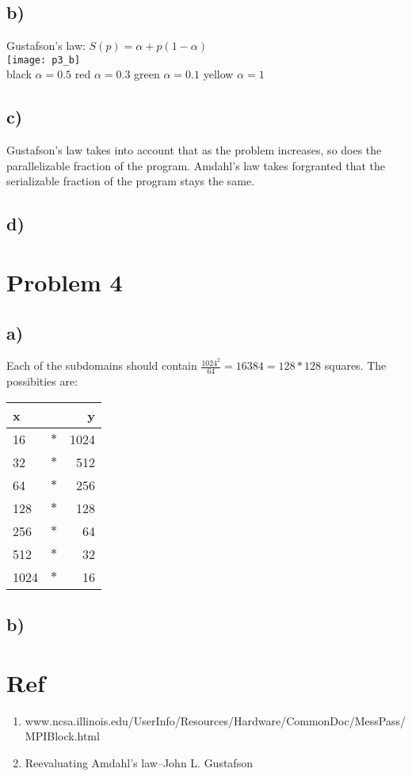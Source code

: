 \documentclass[a4paper, 11pt, english]{article}
\begin{document}
\subsection*{b)}
Gustafson's law: 
\begin{math}
S(p) = \alpha + p(1 - \alpha)
\end{math}\\
\texttt{[image: p3\_b]}
\\black $\alpha = 0.5$ red $\alpha=0.3$ green $\alpha=0.1$ yellow $\alpha=1$
\subsection*{c)}
Gustafson's law takes into account that as the problem increases, so does the parallelizable fraction of the program. Amdahl's law takes forgranted that the serializable fraction of the program stays the same.
\subsection*{d)}


\section*{Problem 4}
\subsection*{a)}
Each of the subdomains should contain  
\begin{math}
\frac{1024^2}{64} = 16384 = 128 * 128
\end{math}
squares. The possibities are:\\
\begin{tabular}{l c r }
	x && y	\\
	\hline
	16 	&$*$& 	1024 	\\
	32 	&$*$& 	512 	\\ 
	64 	&$*$& 	256 	\\
	128 	&$*$& 	128 	\\
	256 	&$*$& 	64 	\\
	512 	&$*$& 	32 	\\
	1024 	&$*$& 	16 	\\
\end{tabular}

\subsection*{b)}


\section*{Ref}
\begin{enumerate}
	\item www.ncsa.illinois.edu/UserInfo/Resources/Hardware/CommonDoc/MessPass/MPIBlock.html
	\item Reevaluating Amdahl's law--John L. Gustafson
\end{enumerate}
\end{document}
